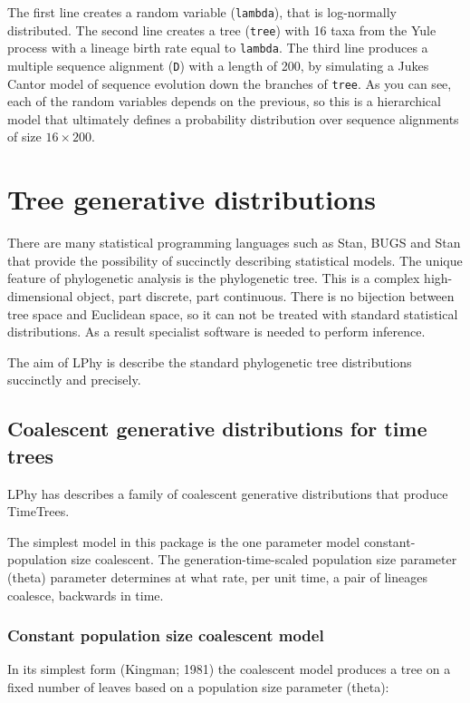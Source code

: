 \documentclass[11pt]{article}
\begin{document}
The first line creates a random variable (\texttt{lambda}), that is log-normally distributed. The second line creates a tree (\texttt{tree}) with 16 taxa from the Yule process with a lineage birth rate equal to \texttt{lambda}. The third line produces a multiple sequence alignment (\texttt{D}) with a length of 200, by simulating a Jukes Cantor model of sequence evolution down the branches of  \texttt{tree}. As you can see, each of the random variables depends on the previous, so this is a hierarchical model that ultimately defines a probability distribution over sequence alignments of size $16 \times 200$.

\section{Tree generative distributions}

There are many statistical programming languages such as Stan, BUGS and Stan that provide the possibility of succinctly describing statistical models. The unique feature of phylogenetic analysis is the phylogenetic tree. This is a complex high-dimensional object, part discrete, part continuous. There is no bijection between tree space and Euclidean space, so it can not be treated with standard statistical distributions. As a result specialist software is needed to perform inference.

The aim of LPhy is describe the standard phylogenetic tree distributions succinctly and precisely.

\subsection{Coalescent generative distributions for time trees}

LPhy has describes a family of coalescent generative distributions that produce TimeTrees.

The simplest model in this package is the one parameter model constant-population size coalescent.
The generation-time-scaled population size parameter (theta) parameter determines at
what rate, per unit time, a pair of lineages coalesce, backwards in time.

\subsubsection{Constant population size coalescent model}

In its simplest form (Kingman; 1981) the coalescent model produces a tree on a fixed number of leaves based on a population size
parameter (theta):
\end{document}
